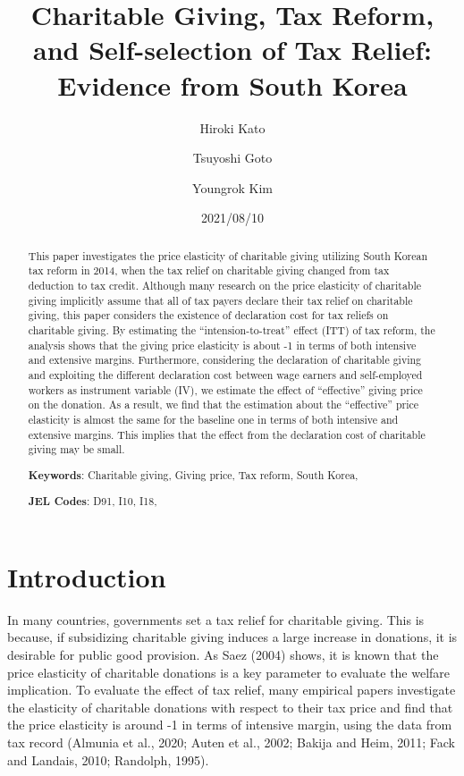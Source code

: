 \documentclass[
  11pt,
  a4paper,
]{article}
\title{Charitable Giving, Tax Reform, and Self-selection of Tax Relief: Evidence from South Korea}
\author[]{Hiroki Kato}
\affil{Graduate School of Economics, Osaka University, Japan \thanks{vge008kh@stundent.econ.osaka-u.ac.jp}}
\author[]{Tsuyoshi Goto}
\affil{Graduate School of Social Sciences, Chiba University, Japan}
\author[]{Youngrok Kim}
\affil{Graduate School of Economics, Kobe University, Japan}
\date{2021/08/10}
\begin{document}
\begin{spacing}{1}
  \maketitle
\end{spacing}
\begin{spacing}{1}
  \begin{abstract}
    This paper investigates the price elasticity of charitable giving utilizing South Korean tax reform in 2014, when the tax relief on charitable giving changed from tax deduction to tax credit. Although many research on the price elasticity of charitable giving implicitly assume that all of tax payers declare their tax relief on charitable giving, this paper considers the existence of declaration cost for tax reliefs on charitable giving.
    By estimating the ``intension-to-treat'' effect (ITT) of tax reform, the analysis shows that the giving price elasticity is about -1 in terms of both intensive and extensive margins. Furthermore, considering the declaration of charitable giving and exploiting the different declaration cost between wage earners and self-employed workers as instrument variable (IV), we estimate the effect of ``effective'' giving price on the donation. As a result, we find that the estimation about the ``effective'' price elasticity is almost the same for the baseline one in terms of both intensive and extensive margins. This implies that the effect from the declaration cost of charitable giving may be small.
    
            \noindent
    \textbf{Keywords}: Charitable giving, Giving price, Tax reform, South Korea, 
        
        \noindent
    \textbf{JEL Codes}: D91, I10, I18, 
        
  \end{abstract}
\end{spacing}

\hypertarget{introduction}{%
\section{Introduction}\label{introduction}}

In many countries, governments set a tax relief for charitable giving. This is because, if subsidizing charitable giving induces a large increase in donations, it is desirable for public good provision. As Saez (2004) shows, it is known that the price elasticity of charitable donations is a key parameter to evaluate the welfare implication. To evaluate the effect of tax relief, many empirical papers investigate the elasticity of charitable donations with respect to their tax price and find that the price elasticity is around -1 in terms of intensive margin, using the data from tax record (Almunia et al., 2020; Auten et al., 2002; Bakija and Heim, 2011; Fack and Landais, 2010; Randolph, 1995).
\end{document}
